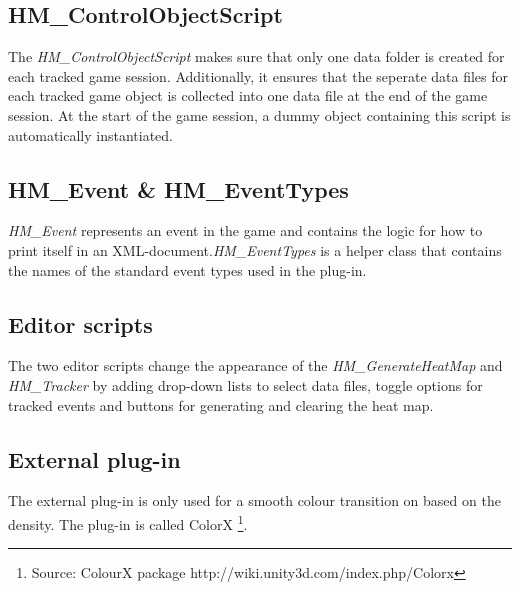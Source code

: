 \subsection{HM\_ControlObjectScript}
\label{CO_COS}
The \textit{HM\_ControlObjectScript} makes sure that only one data folder is created for each tracked game session. Additionally, it ensures that the seperate data files for each tracked game object is collected into one data file at the end of the game session. At the start of the game session, a dummy object containing this script is automatically instantiated. 

\subsection{HM\_Event \& HM\_EventTypes}
\label{CO_Event}
\textit{HM\_Event} represents an event in the game and contains the logic for how to print itself in an XML-document.\textit{HM\_EventTypes} is a helper class that contains the names of the standard event types used in the plug-in.

\subsection{Editor scripts}
\label{CO_Editor}
The two editor scripts change the appearance of the \textit{HM\_GenerateHeatMap} and \textit{HM\_Tracker} by adding drop-down lists to select data files, toggle options for tracked events and buttons for generating and clearing the heat map.
\subsection{External plug-in}
\label{CO_PlugIn}
The external plug-in is only used for a smooth colour transition on based on the density. The plug-in is called ColorX \footnote{Source: ColourX package http://wiki.unity3d.com/index.php/Colorx}.